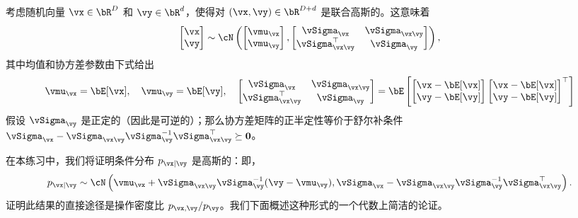 \documentclass[../../book-main_zh.tex]{subfiles}
\begin{document}
\begin{exercise}\label{exercise:conditional_gaussian}
  考虑随机向量 $\vx \in \bR^D$ 和 $\vy \in \bR^d$，使得对 $(\vx, \vy) \in \bR^{D + d}$ 是联合高斯的。这意味着
  \begin{equation*}
    \begin{bmatrix}
      \vx \\
      \vy
    \end{bmatrix}
    \sim
    \cN \left(
      \begin{bmatrix}
        \vmu_{\vx} \\
        \vmu_{\vy}
      \end{bmatrix}
      ,
      \begin{bmatrix}
        \vSigma_{\vx} & \vSigma_{\vx\vy} \\
        \vSigma_{\vx\vy}^\top & \vSigma_{\vy}
      \end{bmatrix}
    \right),
  \end{equation*}
  其中均值和协方差参数由下式给出
  \begin{equation*}
    \vmu_{\vx} = \bE[\vx],\quad \vmu_{\vy} = \bE[\vy],\quad
    \begin{bmatrix}
      \vSigma_{\vx} & \vSigma_{\vx\vy} \\
      \vSigma_{\vx\vy}^\top & \vSigma_{\vy}
    \end{bmatrix}
    =
    \bE\left[
      \begin{bmatrix}
        \vx - \bE[\vx] \\
        \vy - \bE[\vy]
      \end{bmatrix}
      \begin{bmatrix}
        \vx - \bE[\vx] \\
        \vy - \bE[\vy]
      \end{bmatrix}^\top
      \right]
  \end{equation*}
  假设 $\vSigma_{\vy}$ 是正定的（因此是可逆的）；那么协方差矩阵的正半定性等价于舒尔补条件 $\vSigma_{\vx} - \vSigma_{\vx\vy} \vSigma_{\vy}^{-1}
  \vSigma_{\vx\vy}^\top \succeq \Zero$。

  在本练习中，我们将证明条件分布 $p_{\vx \mid
  \vy}$ 是高斯的：即，
  \begin{equation}\label{eq:gaussian-conditional-eqn}
    p_{\vx \mid \vy} \sim \cN\left(
      \vmu_{\vx} + \vSigma_{\vx\vy} \vSigma_{\vy}^{-1} (\vy - \vmu_{\vy}),
      \vSigma_{\vx} - \vSigma_{\vx\vy} \vSigma_{\vy}^{-1}
      \vSigma_{\vx\vy}^{\top}
    \right).
  \end{equation}
  证明此结果的直接途径是操作密度比 $p_{\vx, \vy} / p_{\vy}$。我们下面概述这种形式的一个代数上简洁的论证。


\end{exercise}
\end{document}
